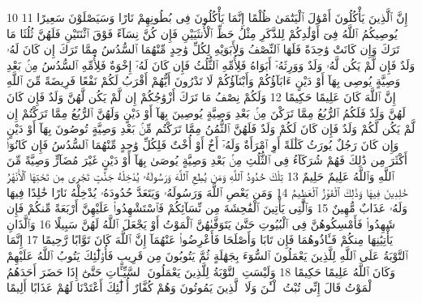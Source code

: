 {\tiny\colorbox{cl_aya}{10}} إِنَّ ٱلَّذِينَ يَأْكُلُونَ أَمْوَٰلَ ٱلْيَتَٰمَىٰ ظُلْمًا إِنَّمَا يَأْكُلُونَ فِى بُطُونِهِمْ نَارًا وَسَيَصْلَوْنَ سَعِيرًا
{\tiny\colorbox{cl_aya}{11}} يُوصِيكُمُ ٱللَّهُ فِىٓ أَوْلَٰدِكُمْ لِلذَّكَرِ مِثْلُ حَظِّ ٱلْأُنثَيَيْنِ فَإِن كُنَّ نِسَآءً فَوْقَ ٱثْنَتَيْنِ فَلَهُنَّ ثُلُثَا مَا تَرَكَ وَإِن كَانَتْ وَٰحِدَةً فَلَهَا ٱلنِّصْفُ وَلِأَبَوَيْهِ لِكُلِّ وَٰحِدٍ مِّنْهُمَا ٱلسُّدُسُ مِمَّا تَرَكَ إِن كَانَ لَهُۥ وَلَدٌ فَإِن لَّمْ يَكُن لَّهُۥ وَلَدٌ وَوَرِثَهُۥٓ أَبَوَاهُ فَلِأُمِّهِ ٱلثُّلُثُ فَإِن كَانَ لَهُۥٓ إِخْوَةٌ فَلِأُمِّهِ ٱلسُّدُسُ مِنۢ بَعْدِ وَصِيَّةٍ يُوصِى بِهَآ أَوْ دَيْنٍ ءَابَآؤُكُمْ وَأَبْنَآؤُكُمْ لَا تَدْرُونَ أَيُّهُمْ أَقْرَبُ لَكُمْ نَفْعًا فَرِيضَةً مِّنَ ٱللَّهِ إِنَّ ٱللَّهَ كَانَ عَلِيمًا حَكِيمًا
{\tiny\colorbox{cl_aya}{12}} وَلَكُمْ نِصْفُ مَا تَرَكَ أَزْوَٰجُكُمْ إِن لَّمْ يَكُن لَّهُنَّ وَلَدٌ فَإِن كَانَ لَهُنَّ وَلَدٌ فَلَكُمُ ٱلرُّبُعُ مِمَّا تَرَكْنَ مِنۢ بَعْدِ وَصِيَّةٍ يُوصِينَ بِهَآ أَوْ دَيْنٍ وَلَهُنَّ ٱلرُّبُعُ مِمَّا تَرَكْتُمْ إِن لَّمْ يَكُن لَّكُمْ وَلَدٌ فَإِن كَانَ لَكُمْ وَلَدٌ فَلَهُنَّ ٱلثُّمُنُ مِمَّا تَرَكْتُم مِّنۢ بَعْدِ وَصِيَّةٍ تُوصُونَ بِهَآ أَوْ دَيْنٍ وَإِن كَانَ رَجُلٌ يُورَثُ كَلَٰلَةً أَوِ ٱمْرَأَةٌ وَلَهُۥٓ أَخٌ أَوْ أُخْتٌ فَلِكُلِّ وَٰحِدٍ مِّنْهُمَا ٱلسُّدُسُ فَإِن كَانُوٓا۟ أَكْثَرَ مِن ذَٰلِكَ فَهُمْ شُرَكَآءُ فِى ٱلثُّلُثِ مِنۢ بَعْدِ وَصِيَّةٍ يُوصَىٰ بِهَآ أَوْ دَيْنٍ غَيْرَ مُضَآرٍّ وَصِيَّةً مِّنَ ٱللَّهِ وَٱللَّهُ عَلِيمٌ حَلِيمٌ
{\tiny\colorbox{cl_aya}{13}} تِلْكَ حُدُودُ ٱللَّهِ وَمَن يُطِعِ ٱللَّهَ وَرَسُولَهُۥ يُدْخِلْهُ جَنَّٰتٍ تَجْرِى مِن تَحْتِهَا ٱلْأَنْهَٰرُ خَٰلِدِينَ فِيهَا وَذَٰلِكَ ٱلْفَوْزُ ٱلْعَظِيمُ
{\tiny\colorbox{cl_aya}{14}} وَمَن يَعْصِ ٱللَّهَ وَرَسُولَهُۥ وَيَتَعَدَّ حُدُودَهُۥ يُدْخِلْهُ نَارًا خَٰلِدًا فِيهَا وَلَهُۥ عَذَابٌ مُّهِينٌ
{\tiny\colorbox{cl_aya}{15}} وَٱلَّٰتِى يَأْتِينَ ٱلْفَٰحِشَةَ مِن نِّسَآئِكُمْ فَٱسْتَشْهِدُوا۟ عَلَيْهِنَّ أَرْبَعَةً مِّنكُمْ فَإِن شَهِدُوا۟ فَأَمْسِكُوهُنَّ فِى ٱلْبُيُوتِ حَتَّىٰ يَتَوَفَّىٰهُنَّ ٱلْمَوْتُ أَوْ يَجْعَلَ ٱللَّهُ لَهُنَّ سَبِيلًا
{\tiny\colorbox{cl_aya}{16}} وَٱلَّذَانِ يَأْتِيَٰنِهَا مِنكُمْ فَـَٔاذُوهُمَا فَإِن تَابَا وَأَصْلَحَا فَأَعْرِضُوا۟ عَنْهُمَآ إِنَّ ٱللَّهَ كَانَ تَوَّابًا رَّحِيمًا
{\tiny\colorbox{cl_aya}{17}} إِنَّمَا ٱلتَّوْبَةُ عَلَى ٱللَّهِ لِلَّذِينَ يَعْمَلُونَ ٱلسُّوٓءَ بِجَهَٰلَةٍ ثُمَّ يَتُوبُونَ مِن قَرِيبٍ فَأُو۟لَٰٓئِكَ يَتُوبُ ٱللَّهُ عَلَيْهِمْ وَكَانَ ٱللَّهُ عَلِيمًا حَكِيمًا
{\tiny\colorbox{cl_aya}{18}} وَلَيْسَتِ ٱلتَّوْبَةُ لِلَّذِينَ يَعْمَلُونَ ٱلسَّيِّـَٔاتِ حَتَّىٰٓ إِذَا حَضَرَ أَحَدَهُمُ ٱلْمَوْتُ قَالَ إِنِّى تُبْتُ ٱلْـَٰٔنَ وَلَا ٱلَّذِينَ يَمُوتُونَ وَهُمْ كُفَّارٌ أُو۟لَٰٓئِكَ أَعْتَدْنَا لَهُمْ عَذَابًا أَلِيمًا
